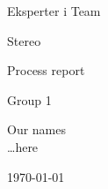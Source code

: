 \begin{titlepage}
\begin{center}
\vspace*{1in}
{\LARGE Eksperter i Team}
\par
\vspace{1cm}


\begin{figure}[ht!]
\centering
\label{overflow}
\end{figure}


{\LARGE Stereo}
\par
\vspace{0.6in}
{\LARGE Process report}
\par
\vspace{0.2in}
{\Large Group 1}
\par
\vfill
\par
\vspace{0.5in}
Our names\\ \ldots here\\
\par
\vspace{0.4cm}
\today
\end{center}
\end{titlepage}
